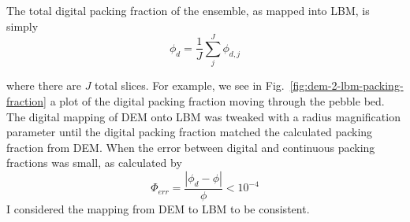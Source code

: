 The total digital packing fraction of the ensemble, as mapped into LBM, is simply
\begin{equation}
	\phi_d = \frac{1}{J}\sum_j^J\phi_{d,j}
\end{equation}

where there are $J$ total slices. For example, we see in Fig.~\ref{fig:dem-2-lbm-packing-fraction} a plot of the digital packing fraction moving through the pebble bed. The digital mapping of DEM onto LBM was tweaked with a radius magnification parameter until the digital packing fraction matched the calculated packing fraction from DEM. When the error between digital and continuous packing fractions was small, as calculated by
\begin{equation}
	\Phi_{err} = \frac{|\phi_d - \phi|}{\phi} < 10^{-4}
\end{equation}
I considered the mapping from DEM to LBM to be consistent.
\FloatBarrier